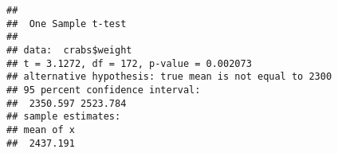 \documentclass[]{article}
\newenvironment{Shaded}{\begin{snugshade}}{\end{snugshade}}
\newcommand{\DataTypeTok}[1]{\textcolor[rgb]{0.13,0.29,0.53}{#1}}
\newcommand{\DecValTok}[1]{\textcolor[rgb]{0.00,0.00,0.81}{#1}}
\newcommand{\KeywordTok}[1]{\textcolor[rgb]{0.13,0.29,0.53}{\textbf{#1}}}
\newcommand{\NormalTok}[1]{#1}
\newcommand{\OperatorTok}[1]{\textcolor[rgb]{0.81,0.36,0.00}{\textbf{#1}}}
\begin{document}
\begin{Shaded}
\end{Shaded}

\begin{verbatim}
## 
##  One Sample t-test
## 
## data:  crabs$weight
## t = 3.1272, df = 172, p-value = 0.002073
## alternative hypothesis: true mean is not equal to 2300
## 95 percent confidence interval:
##  2350.597 2523.784
## sample estimates:
## mean of x 
##  2437.191
\end{verbatim}
\end{document}
